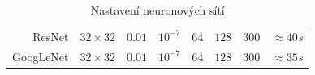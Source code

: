 \documentclass[10pt,a4paper, table]{article}
\begin{document}
\begin{table}[h]
\begin{tabular}{r|lllllll}
    ResNet                     &
    $32 \times 32$             &
    $0.01$                     &
    $10^{-7}$                  &
    $64$                       &
    $128$                      &
    $300$                      &
    $\approx 40s$                \\

    GoogLeNet                  &
    $32 \times 32$             &
    $0.01$                     &
    $10^{-7}$                  &
    $64$                       &
    $128$                      &
    $300$                      &
    $\approx 35s$                \\\hline
  \end{tabular}
  \caption{Nastavení neuronových sítí}
  \label{tab:dnnSetting}
  \centering
\end{table}
\end{document}
